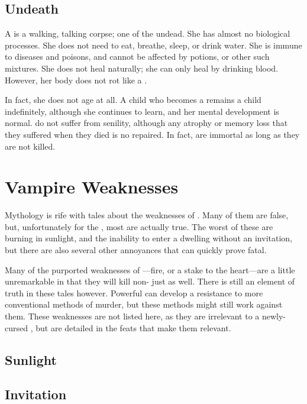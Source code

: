 \subsection{Undeath}

A {\vampire} is a walking, talking corpse; one of the undead.
She has almost no biological processes.
She does not need to eat, breathe, sleep, or drink water.
She is immune to diseases and poisons, and cannot be affected by potions, or other such mixtures.
She does not heal naturally; she can only heal by drinking blood.
However, her body does not rot like a .

In fact, she does not age at all.
A child who becomes a {\vampire} remains a child indefinitely, although she continues to learn, and her mental development is normal.
{\vampires} do not suffer from senility, although any atrophy or memory loss that they suffered when they died is no repaired.
In fact, {\vampires} are immortal as long as they are not killed.

\section{Vampire Weaknesses}

Mythology is rife with tales about the weaknesses of {\vampires}.
Many of them are false, but, unfortunately for the {\vampires}, most are actually true.
The worst of these are burning in sunlight, and the inability to enter a dwelling without an invitation, but there are also several other annoyances that can quickly prove fatal.

Many of the purported weaknesses of {\vampires}---fire, or a stake to the heart---are a little unremarkable in that they will kill non-{\vampires} just as well.
There is still an element of truth in these tales however.
Powerful {\vampires} can develop a resistance to more conventional methods of murder, but these methods might still work against them.
These weaknesses are not listed here, as they are irrelevant to a newly-cursed {\vampire}, but are detailed in the feats that make them relevant.

\subsection{Sunlight}



\subsection{Invitation}

